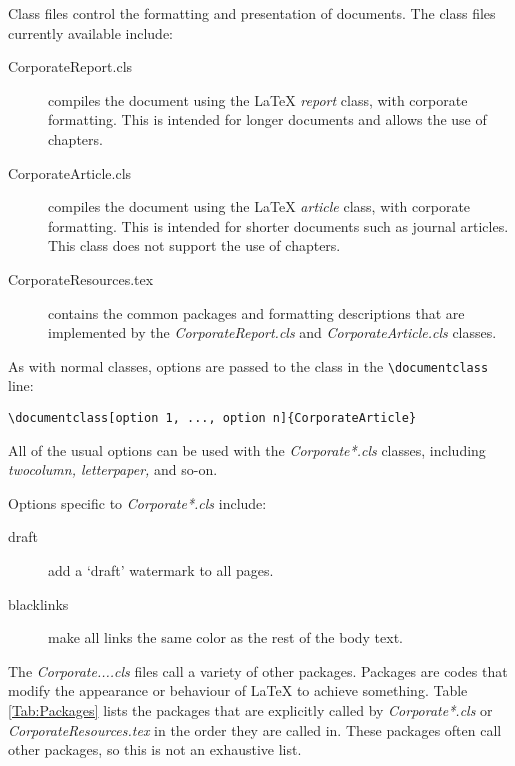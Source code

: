 Class files control the formatting and presentation of documents. The class files currently available include:
\begin{description}
\item[CorporateReport.cls]{compiles the document using the LaTeX \emph{report} class, with corporate formatting. This is intended for longer documents and allows the use of chapters.}
\item[CorporateArticle.cls] compiles the document using the LaTeX \emph{article} class, with corporate formatting. This is intended for shorter documents such as journal articles. This class does not support the use of chapters.
\item[CorporateResources.tex] contains the common packages and formatting descriptions that are implemented by the \emph{CorporateReport.cls} and \emph{CorporateArticle.cls} classes.
\end{description}

As with normal classes, options are passed to the class in the \verb+\documentclass+ line:

\begin{lstlisting}
\documentclass[option 1, ..., option n]{CorporateArticle}
\end{lstlisting}

All of the usual options can be used with the \emph{Corporate*.cls} classes, including \emph{twocolumn, letterpaper,} and so-on.

Options specific to \emph{Corporate*.cls} include:
\begin{description}
\item[draft]{add a `draft' watermark to all pages.}
\item[blacklinks]{make all links the same color as the rest of the body text.}
\end{description}

The \emph{Corporate....cls} files call a variety of other packages. Packages are codes that modify the appearance or behaviour of LaTeX to achieve something. Table \ref{Tab:Packages} lists the packages that are explicitly called by \emph{Corporate*.cls} or \emph{CorporateResources.tex} in the order they are called in. These packages often call other packages, so this is not an exhaustive list.


